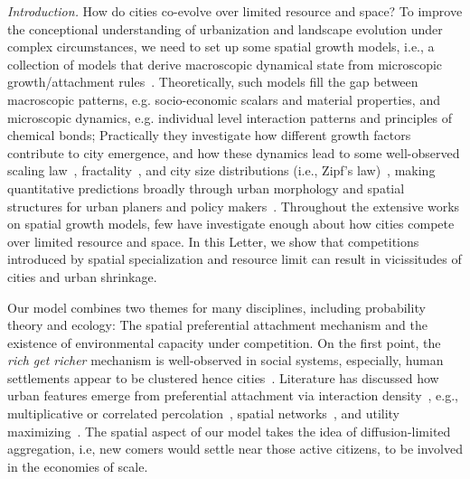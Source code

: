 \documentclass[reprint,unsortedaddress,amsmath,amssymb,aps,prl,showkeys]{revtex4-2}
\begin{document}
\textit{Introduction.} How do cities co-evolve over limited resource and space? To improve the conceptional understanding of urbanization and landscape evolution under complex circumstances, we need to set up some spatial growth models, i.e., a collection of models that derive macroscopic dynamical state from microscopic growth/attachment rules~\cite{PhysRevX.4.011008, Li2017Simple, makse1995modelling, rybski2013distance, nanda2017spatial}. %
Theoretically, such models fill the gap between macroscopic patterns, e.g. socio-economic scalars and material properties, and microscopic dynamics, e.g. individual level interaction patterns and principles of chemical bonds; Practically they investigate how different growth factors contribute to city emergence, and how these dynamics lead to some well-observed scaling law~\cite{bettencourt2007growth,court2013origins,batty2008size,batty2019urbanscalinglaw}, fractality~\cite{batty1994fractal,batty2007cities}, and city size distributions (i.e., Zipf's law)~\cite{zipf1949human}, making quantitative predictions broadly through urban morphology and spatial structures for urban planers and policy makers~\cite{anas1998urban}. Throughout the extensive works on spatial growth models, few have investigate enough about how cities compete over limited resource and space. In this Letter, we show that competitions introduced by spatial specialization and resource limit can result in vicissitudes of cities and urban shrinkage.


Our model combines two themes for many disciplines, including probability theory and ecology: The spatial preferential attachment mechanism and the existence of environmental capacity under competition. On the first point, the \textit{rich get richer} mechanism is well-observed in social systems, especially, human settlements appear to be clustered hence cities~\cite{marsili1998interacting}. Literature has discussed how urban features emerge from preferential attachment via interaction density~\cite{ccolak2016understanding,louf2014congestion,fujita1976spatial}, e.g., multiplicative or correlated percolation~\cite{makse1995modelling,PhysRevE.58.7054,rybski2013distance}, spatial networks~\cite{marsili1998interacting,court2013origins,Li2017Simple}, and utility maximizing~\cite{PhysRevE.90.042815,axtell2001emergent}. The spatial aspect of our model takes the idea of diffusion-limited aggregation\cite{makse1995modelling, rybski2013distance, kleinberg2000navigation}, i.e, new comers would settle near those active citizens, to be involved in the economies of scale.
\end{document}

